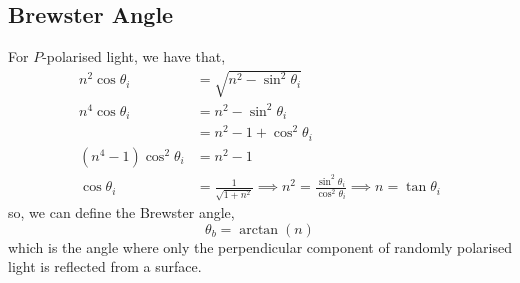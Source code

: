 \documentclass{book}
\begin{document}
\subsection{Brewster Angle}
For $P$-polarised light, we have that,
\begin{equation}
	\begin{split}
		n^2 \cos\theta_i &= \sqrt{n^2 - \sin^2\theta_i} \\
		n^4 \cos\theta_i & = n^2 - \sin^2\theta_i \\
		& = n^2 - 1 + \cos^2\theta_i \\
		(n^4 -1)\cos^2\theta_i & = n^2 -1 \\
		\cos\theta_i & = \frac{1}{\sqrt{1 +n^2}} \implies n^2= \frac{\sin^2\theta_i}{\cos^2\theta_i} \implies n = \tan\theta_i 
	\end{split}
\end{equation}
so, we can define the Brewster angle,
\begin{equation}
	\boxed{\theta_b = \arctan(n)}
\end{equation}
which is the angle where only the perpendicular component of randomly polarised light is reflected from a surface.
\end{document}
